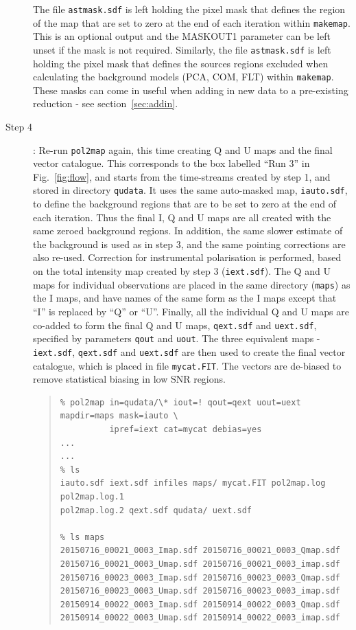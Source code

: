 \documentclass[twoside,11pt]{starlink}
\begin{document}
\begin{description}
The file \texttt{astmask.sdf} is left holding the pixel mask that defines
the region of the map that are set to zero at the end of each iteration
within \texttt{makemap}. This is an optional output and the MASKOUT1
parameter can be left unset if the mask is not required. Similarly, the
file \texttt{astmask.sdf} is left holding the pixel mask that defines the
sources regions excluded when calculating the background models (PCA, COM,
FLT) within \texttt{makemap}. These masks can come in useful when adding
in new data to a pre-existing reduction - see section~\ref{sec:addin}.

\item[Step 4]:  Re-run \texttt{pol2map} again, this time creating Q and U
maps and the final vector catalogue. This corresponds to the box
labelled ``Run 3'' in Fig.~\ref{fig:flow}, and starts from the
time-streams created by step 1, and stored in directory \texttt{qudata}.
It uses the same auto-masked map, \texttt{iauto.sdf}, to define the
background regions that are to be set to zero at the end of each
iteration. Thus the final I, Q and U maps are all created with the same
zeroed background regions. In addition, the same slower estimate of the
background is used as in step 3, and the same pointing corrections are
also re-used. Correction for instrumental polarisation is performed,
based on the total intensity map created by step 3 (\texttt{iext.sdf}).
The Q and U maps for individual observations are placed in the same
directory (\texttt{maps}) as the I maps, and have names of the same form
as the I maps except that ``I'' is replaced by ``Q'' or ``U''. Finally,
all the individual Q and U maps are co-added to form the final Q and U
maps, \texttt{qext.sdf} and \texttt{uext.sdf}, specified by parameters
\texttt{qout} and \texttt{uout}. The three equivalent maps -
\texttt{iext.sdf}, \texttt{qext.sdf} and \texttt{uext.sdf} are then used
to create the final vector catalogue, which is placed in file
\texttt{mycat.FIT}. The vectors are de-biased to remove statistical
biasing in low SNR regions.

\begin{quote}
\begin{verbatim}
% pol2map in=qudata/\* iout=! qout=qext uout=uext mapdir=maps mask=iauto \
          ipref=iext cat=mycat debias=yes
...
...
% ls
iauto.sdf iext.sdf infiles maps/ mycat.FIT pol2map.log pol2map.log.1
pol2map.log.2 qext.sdf qudata/ uext.sdf

% ls maps
20150716_00021_0003_Imap.sdf 20150716_00021_0003_Qmap.sdf
20150716_00021_0003_Umap.sdf 20150716_00021_0003_imap.sdf
20150716_00023_0003_Imap.sdf 20150716_00023_0003_Qmap.sdf
20150716_00023_0003_Umap.sdf 20150716_00023_0003_imap.sdf
20150914_00022_0003_Imap.sdf 20150914_00022_0003_Qmap.sdf
20150914_00022_0003_Umap.sdf 20150914_00022_0003_imap.sdf

\end{verbatim}
\end{quote}


\end{description}
\end{document}
